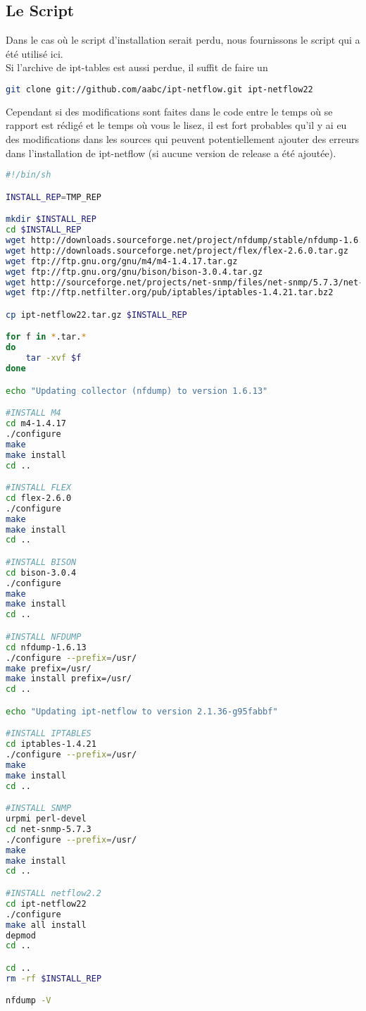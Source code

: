 \subsection{Le Script}
Dans le cas où le script d'installation serait perdu, nous fournissons le script qui a été utilisé ici.\\
Si l'archive de ipt-tables est aussi perdue, il suffit de faire un
\begin{lstlisting}[language=bash,style=custombash]
 git clone git://github.com/aabc/ipt-netflow.git ipt-netflow22
\end{lstlisting} 
Cependant si des modifications sont faites dans le code entre le temps où se rapport est rédigé et le temps où vous le lisez, il est fort probables qu'il y ai eu des modifications dans les sources qui peuvent potentiellement ajouter des erreurs dans l'installation de ipt-netflow (si aucune version de release a été ajoutée).

\begin{lstlisting}[language=bash,style=custombash]
#!/bin/sh

INSTALL_REP=TMP_REP

mkdir $INSTALL_REP
cd $INSTALL_REP
wget http://downloads.sourceforge.net/project/nfdump/stable/nfdump-1.6.13/nfdump-1.6.13.tar.gz
wget http://downloads.sourceforge.net/project/flex/flex-2.6.0.tar.gz
wget ftp://ftp.gnu.org/gnu/m4/m4-1.4.17.tar.gz
wget ftp://ftp.gnu.org/gnu/bison/bison-3.0.4.tar.gz
wget http://sourceforge.net/projects/net-snmp/files/net-snmp/5.7.3/net-snmp-5.7.3.tar.gz
wget ftp://ftp.netfilter.org/pub/iptables/iptables-1.4.21.tar.bz2

cp ipt-netflow22.tar.gz $INSTALL_REP

for f in *.tar.*
do 
	tar -xvf $f
done

echo "Updating collector (nfdump) to version 1.6.13"

#INSTALL M4
cd m4-1.4.17
./configure
make
make install
cd ..

#INSTALL FLEX
cd flex-2.6.0
./configure
make
make install
cd ..

#INSTALL BISON
cd bison-3.0.4
./configure
make
make install
cd ..

#INSTALL NFDUMP
cd nfdump-1.6.13
./configure --prefix=/usr/
make prefix=/usr/
make install prefix=/usr/
cd ..

echo "Updating ipt-netflow to version 2.1.36-g95fabbf"

#INSTALL IPTABLES
cd iptables-1.4.21
./configure --prefix=/usr/
make
make install
cd ..

#INSTALL SNMP
urpmi perl-devel
cd net-snmp-5.7.3
./configure --prefix=/usr/
make
make install
cd ..

#INSTALL netflow2.2
cd ipt-netflow22
./configure
make all install
depmod
cd ..

cd ..
rm -rf $INSTALL_REP

nfdump -V

\end{lstlisting} 